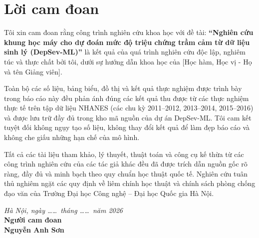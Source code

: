 \chapter*{Lời cam đoan}

Tôi xin cam đoan rằng công trình nghiên cứu khoa học với đề tài: \textbf{“Nghiên cứu khung học máy cho dự đoán mức độ triệu chứng trầm cảm từ dữ liệu sinh lý (DepSev-ML)”} là kết quả của quá trình nghiên cứu độc lập, nghiêm túc và thực chất bởi tôi, dưới sự hướng dẫn khoa học của [Học hàm, Học vị - Họ và tên Giảng viên].

Toàn bộ các số liệu, bảng biểu, đồ thị và kết quả thực nghiệm được trình bày trong báo cáo này đều phản ánh đúng các kết quả thu được từ các thực nghiệm thực tế trên tập dữ liệu NHANES (các chu kỳ 2011--2012, 2013--2014, 2015--2016) và được lưu trữ đầy đủ trong kho mã nguồn của dự án DepSev-ML. Tôi cam kết tuyệt đối không ngụy tạo số liệu, không thay đổi kết quả để làm đẹp báo cáo và không che giấu những hạn chế của mô hình.

Tất cả các tài liệu tham khảo, lý thuyết, thuật toán và công cụ kế thừa từ các công trình nghiên cứu của các tác giả khác đều đã được trích dẫn nguồn gốc rõ ràng, đầy đủ và minh bạch theo quy chuẩn học thuật quốc tế. Nghiên cứu tuân thủ nghiêm ngặt các quy định về liêm chính học thuật và chính sách phòng chống đạo văn của Trường Đại học Công nghệ -- Đại học Quốc gia Hà Nội.

\vspace{1.5cm}
\begin{flushright}
\textit{Hà Nội, ngày \dots\dots\ tháng \dots\dots\ năm 2026}\\[0.2cm]
\textbf{Người cam đoan}\\[1.5cm]
\textbf{Nguyễn Anh Sơn}
\end{flushright}
\cleardoublepage

